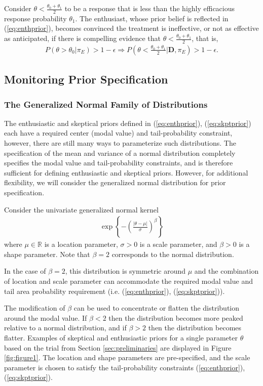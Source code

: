 \documentclass[12pt]{article}
\begin{document}
Consider $\theta<\frac{\theta_0+\theta_1}{2}$ to be a response that is less than the highly efficacious response probability $\theta_1$. The enthusiast, whose prior belief is reflected in (\ref{eq:enthprior}), becomes convinced the treatment is ineffective, or not as effective as anticipated, if there is compelling evidence that $\theta<\frac{\theta_0+\theta_1}{2}$, that is, 
\begin{align}
P(\theta>\theta_0|\pi_{E})>1-\epsilon\Rightarrow P\left(\theta<\frac{\theta_0+\theta_1}{2}\Big| \mathbf{D},\pi_{E}\right)>1-\epsilon.
\end{align}
%
\subsection{Monitoring Prior Specification}
\subsubsection{The Generalized Normal Family of Distributions}
The enthusiastic and skeptical priors defined in (\ref{eq:enthprior}), (\ref{eq:skptprior}) each have a required center (modal value) and tail-probability constraint, however, there are still many ways to parameterize such distributions. The specification of the mean and variance of a normal distribution completely specifies the modal value and tail-probability constraints, and is therefore sufficient for defining enthusiastic and skeptical priors. However, for additional flexibility, we will consider the generalized normal distribution for prior specification.

Consider the univariate generalized normal kernel 
\begin{align}\label{eq:generalizednormalkernel}
\exp\left\{-\left(\frac{|\theta-\mu|}{\sigma}\right)^\beta\right\}
\end{align} where $\mu\in\mathbb{R}$ is a location parameter, $\sigma>0$ is a scale parameter, and $\beta>0$ is a shape parameter. Note that $\beta=2$ corresponds to the normal distribution. 

In the case of $\beta=2$, this distribution is symmetric around $\mu$ and the combination of location and scale parameter can accommodate the required modal value and tail area probability requirement (i.e. (\ref{eq:enthprior}), (\ref{eq:skptprior})). 

The modification of $\beta$ can be used to concentrate or flatten the distribution around the modal value. If $\beta<2$ then the distribution becomes more peaked relative to a normal distribution, and if $\beta>2$ then the distribution becomes flatter. Examples of skeptical and enthusiastic priors for a single parameter $\theta$ based on the trial from Section \ref{sec:preliminaries} are displayed in Figure \ref{fig:figure1}. The location and shape parameters are pre-specified, and the scale parameter is chosen to satisfy the tail-probability constraints (\ref{eq:enthprior}), (\ref{eq:skptprior}).
\end{document}

